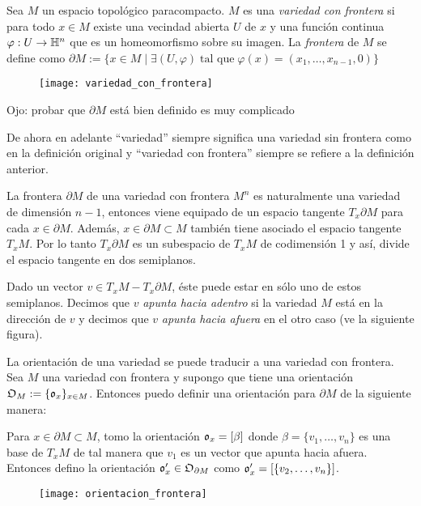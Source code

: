 \documentclass[../../topologia_algebraica]{subfiles}
\begin{document}
\begin{defin}
  Sea $M$ un espacio topol\'ogico paracompacto. $M$ es una \emph{variedad con frontera} si para
  todo $x\in M$ existe una vecindad abierta $U$ de $x$ y una funci\'on continua $\varphi:U\rightarrow\mathbb{H}^n$
  que es un homeomorfismo sobre su imagen. La \emph{frontera} de $M$ se define como
  $\partial M:=\{x\in M\mid \exists (U,\varphi)\;\text{tal que}\;\varphi(x)=(x_1,\ldots,x_{n-1},0)\}$
  \begin{figure}[ht]%
    \centering
    \texttt{[image: variedad\_con\_frontera]}
  \end{figure}%
\end{defin}

\noindent Ojo: probar que $\partial M$ est\'a bien definido es muy complicado

\begin{nota}
  De ahora en adelante ``variedad'' siempre significa una variedad sin frontera como en la definici\'on
  original y ``variedad con frontera'' siempre se refiere a la definici\'on anterior.
\end{nota}

La frontera $\partial M$ de una variedad con frontera $M^n$ es naturalmente una variedad de
dimensi\'on $n-1$, entonces viene equipado de un espacio tangente $T_x\partial M$ para cada
$x\in \partial M$. Adem\'as, $x\in \partial M\subset M$ tambi\'en tiene asociado el espacio tangente
$T_xM$. Por lo tanto $T_x\partial M$ es un subespacio de $T_xM$ de codimensi\'on 1 y as\'i, divide
el espacio tangente en dos semiplanos.

Dado un vector $v\in T_xM-T_x\partial M$, \'este puede estar en s\'olo uno de estos semiplanos.
Decimos que $v$ \emph{apunta hacia adentro} si la variedad $M$ est\'a en la direcci\'on de $v$
y decimos que $v$ \emph{apunta hacia afuera} en el otro caso (ve la siguiente figura).

La orientaci\'on de una variedad se puede traducir a una variedad con frontera. Sea $M$ una variedad
con frontera y supongo que tiene una orientaci\'on $\mathfrak{O}_M:=\{\mathfrak{o}_x\}_{x\in M}$. Entonces puedo
definir una orientaci\'on para $\partial M$ de la siguiente manera:

Para $x\in\partial M\subset M$, tomo la orientaci\'on $\mathfrak{o}_x=[\beta]$ donde $\beta=\{v_1,\ldots,v_n\}$
es una base de $T_xM$ de tal manera que $v_1$ es un vector que apunta hacia afuera. Entonces defino
la orientaci\'on $\mathfrak{o}'_x\in\mathfrak{O}_{\partial M}$ como $\mathfrak{o}'_x=[\{v_2,\ldots,v_n\}]$.
\begin{figure}[ht]%
  \centering
  \texttt{[image: orientacion\_frontera]}
\end{figure}%
\end{document}
